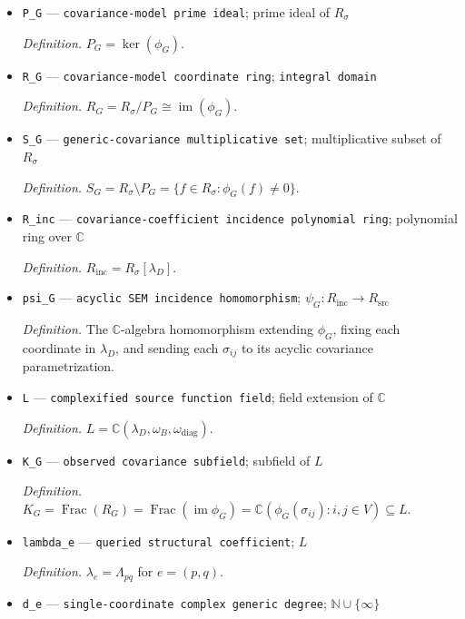 \documentclass{article}
\begin{document}
\begin{itemize}
  \item \texttt{P\_\allowbreak{}G} --- \texttt{covariance-\allowbreak{}model prime ideal}; prime ideal of \(R_{\sigma}\)
  \par\smallskip\noindent\emph{Definition.} \(P_G=\ker(\phi_G)\).
  \item \texttt{R\_\allowbreak{}G} --- \texttt{covariance-\allowbreak{}model coordinate ring}; \texttt{integral domain}
  \par\smallskip\noindent\emph{Definition.} \(R_G=R_{\sigma}/P_G\cong\operatorname{im}(\phi_G)\).
  \item \texttt{S\_\allowbreak{}G} --- \texttt{generic-\allowbreak{}covariance multiplicative set}; multiplicative subset of \(R_{\sigma}\)
  \par\smallskip\noindent\emph{Definition.} \(S_G=R_{\sigma}\setminus P_G=\{f\in R_{\sigma}:\phi_G(f)\ne0\}\).
  \item \texttt{R\_\allowbreak{}inc} --- \texttt{covariance-\allowbreak{}coefficient incidence polynomial ring}; polynomial ring over \(\mathbb C\)
  \par\smallskip\noindent\emph{Definition.} \(R_{\mathrm{inc}}=R_{\sigma}[\lambda_D]\).
  \item \texttt{psi\_\allowbreak{}G} --- \texttt{acyclic SEM incidence homomorphism}; \(\psi_G:R_{\mathrm{inc}}\to R_{\mathrm{src}}\)
  \par\smallskip\noindent\emph{Definition.} The \(\mathbb C\)-algebra homomorphism extending \(\phi_G\), fixing each coordinate in \(\lambda_D\), and sending each \(\sigma_{ij}\) to its acyclic covariance parametrization.
  \item \texttt{L} --- \texttt{complexified source function field}; field extension of \(\mathbb C\)
  \par\smallskip\noindent\emph{Definition.} \(L=\mathbb C(\lambda_D,\omega_B,\omega_{\mathrm{diag}})\).
  \item \texttt{K\_\allowbreak{}G} --- \texttt{observed covariance subfield}; subfield of \(L\)
  \par\smallskip\noindent\emph{Definition.} \(K_G=\operatorname{Frac}(R_G)=\operatorname{Frac}(\operatorname{im}\phi_G)=\mathbb C(\phi_G(\sigma_{ij}):i,j\in V)\subseteq L\).
  \item \texttt{lambda\_\allowbreak{}e} --- \texttt{queried structural coefficient}; \(L\)
  \par\smallskip\noindent\emph{Definition.} \(\lambda_e=\Lambda_{pq}\) for \(e=(p,q)\).
  \item \texttt{d\_\allowbreak{}e} --- \texttt{single-\allowbreak{}coordinate complex generic degree}; \(\mathbb N\cup\{\infty\}\)

\end{itemize}
\end{document}
